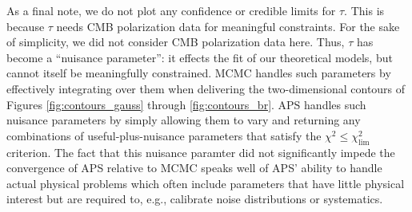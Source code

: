 \documentclass[useAMS,usenatbib]{aastex}
\begin{document}
As a final note, we do not plot any confidence or 
credible limits for $\tau$.
This is because $\tau$ needs CMB polarization data for meaningful constraints.  For the sake
of simplicity, we did not consider CMB polarization data here.  Thus, $\tau$ has become a
``nuisance parameter'': it effects the fit of our theoretical models, but cannot itself be
meaningfully constrained.  MCMC handles such parameters by effectively integrating over them
when delivering the two-dimensional contours of Figures
\ref{fig:contours_gauss} through \ref{fig:contours_br}.  
APS handles such nuisance parameters by
simply allowing them to vary and returning any combinations of useful-plus-nuisance parameters
that satisfy the $\chi^2\le\chi^2_\text{lim}$ criterion.  The fact that this nuisance
paramter did not significantly impede the convergence of APS relative to MCMC speaks 
well of
APS' ability to handle actual physical problems which 
often include parameters that have
little physical interest but are required to, e.g., 
calibrate noise distributions or
systematics.

\begin{figure*}
\caption{
95\% confidence limits in two-dimensional slices of parameter space as
determined by MCMC and APS after 100,000 points have been sampled.  Solid (black)
contours are the baseline result found by 4 MCMC chains
after sampling a total of 460,000 points.  
Dotted (green) contours are the result found by a 4 MCMC
chains after each has sampled 25,000 points (for a total of 100,000
sampled points).  Red points show the $\chi^2\le\chi^2_\text{min}+12.59$
points found by APS after sampling a total of 100,000 points.
These plots use equation (\ref{eq:covraw}) for the covariogram.
}
\label{fig:contours_gauss}
\end{figure*}
\end{document}
